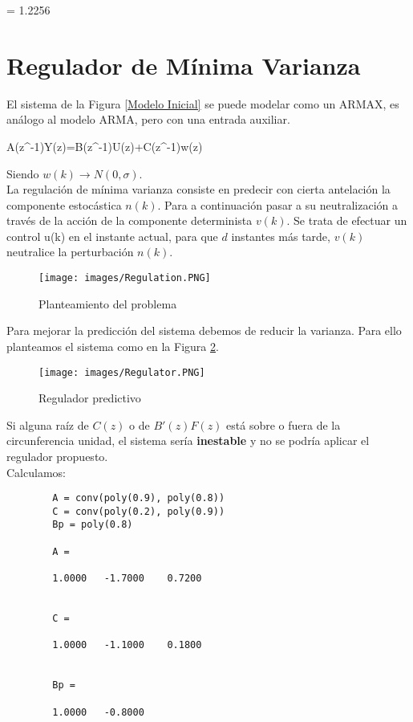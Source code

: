 \documentclass[a4paper, fontsize=11pt]{scrartcl} %
\numberwithin{equation}{section} %
\numberwithin{figure}{section} %
\numberwithin{table}{section} %
\newenvironment{myalign}{\par\nobreak\large\noindent\align}{\endalign} %
\begin{document}
	\begin{myalign}
		\sigma = 1.2256
		\label{varOr}
	\end{myalign}

	\section{Regulador de Mínima Varianza}	
	
	El sistema de la Figura \ref{Modelo Inicial} se puede modelar como un ARMAX, es análogo al modelo ARMA, pero con una entrada auxiliar.
	
	\begin{myalign}
		A(z^{-1})Y(z)=B(z^{-1})U(z)+C(z^{-1})w(z)\\
	\end{myalign}
	
	Siendo $w(k) \rightarrow N(0,\sigma)$.\\
	
	La regulación de mínima varianza consiste en predecir con cierta antelación la componente estocástica $n(k)$. Para a continuación pasar a su neutralización a través de la acción de la componente determinista $v(k)$. Se trata de efectuar un control u(k) en el instante actual, para que $d$ instantes más tarde, $v(k)$ neutralice la perturbación $n(k)$.\\
	
	\begin{figure}[h!]
		\centering
		\texttt{[image: images/Regulation.PNG]}
		\caption{Planteamiento del problema}
		\label{Regulation}
	\end{figure}
	\FloatBarrier
	
	Para mejorar la predicción del sistema debemos de reducir la varianza. Para ello planteamos el sistema como en la Figura \ref{Regulator}.
	
	\begin{figure}[h!]
		\centering
		\texttt{[image: images/Regulator.PNG]}
		\caption{Regulador predictivo}
		\label{Regulator}
	\end{figure}
	\FloatBarrier
	
	Si alguna raíz de $C(z)$ o de $B'(z)F(z)$ está sobre o fuera de la circunferencia unidad, el sistema sería \textbf{inestable} y no se podría aplicar el regulador propuesto.\\
	
	Calculamos:
	
	\begin{lstlisting}
		A = conv(poly(0.9), poly(0.8))
		C = conv(poly(0.2), poly(0.9))
		Bp = poly(0.8)
		
		A =
		
		1.0000   -1.7000    0.7200
		
		
		C =
		
		1.0000   -1.1000    0.1800
		
		
		Bp =
		
		1.0000   -0.8000
		
	\end{lstlisting}
	
\end{document}
